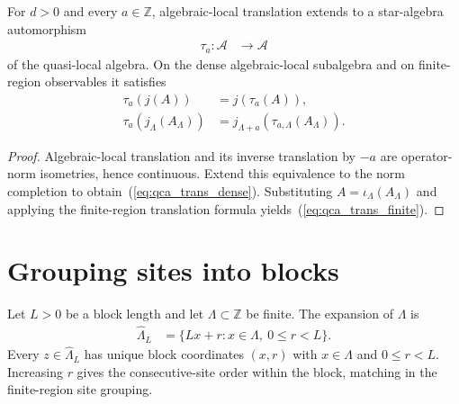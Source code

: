 \begin{definition}
    \label{def:qca_quasi_local_translation}
    \leanok
    For $d>0$ and every $a\in\mathbb Z$, algebraic-local translation extends to
    a star-algebra automorphism
    \begin{align}
        \tau_a\colon\mathcal A & \longrightarrow\mathcal A
    \end{align}
    of the quasi-local algebra.  On the dense algebraic-local subalgebra and on
    finite-region observables it satisfies
    \begin{align}
        \tau_a(j(A)) & =j(\tau_a(A)),
        \label{eq:qca_trans_dense}                                  \\
        \tau_a(j_\Lambda(A_\Lambda))
                     & =j_{\Lambda+a}(\tau_{a,\Lambda}(A_\Lambda)).
        \label{eq:qca_trans_finite}
    \end{align}
\end{definition}

\begin{proof}\leanok
    Algebraic-local translation and its inverse translation by $-a$ are
    operator-norm isometries, hence continuous.  Extend this equivalence to the
    norm completion to obtain~(\ref{eq:qca_trans_dense}).
    Substituting $A=\iota_\Lambda(A_\Lambda)$ and applying the finite-region
    translation formula yields~(\ref{eq:qca_trans_finite}).
\end{proof}

\section{Grouping sites into blocks}

\begin{definition}
    \label{def:qca_expanded_region}
    \leanok
    Let $L>0$ be a block length and let $\Lambda\subset\mathbb Z$ be finite.
    The expansion of $\Lambda$ is
    \begin{align}
        \widehat\Lambda_L
         & =\{Lx+r:x\in\Lambda,\ 0\leq r<L\}.
    \end{align}
    Every $z\in\widehat\Lambda_L$ has unique block coordinates $(x,r)$ with
    $x\in\Lambda$ and $0\leq r<L$.  Increasing $r$ gives the consecutive-site
    order within the block, matching in \cite[lines~2308 and 2313--2320]{Cirac2017MPU} the finite-region site
    grouping.
\end{definition}


